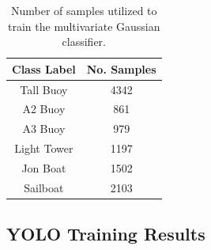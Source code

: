 \documentclass{erauthesis}
\begin{document}


\begin{table}[htpb]
\centering
\begin{tabular}{cc}
\hline
Class Label & No. Samples \\
\hline
\hline
Tall Buoy   & 4342        \\
A2 Buoy     & 861         \\
A3 Buoy     & 979         \\
Light Tower & 1197        \\
Jon Boat    & 1502        \\
Sailboat    & 2103       \\
\hline
\end{tabular}
\caption{Number of samples utilized to train the multivariate Gaussian classifier.}
\end{table}


\subsection{YOLO Training Results} \label{sec:yolo_train_results}

\end{document}
